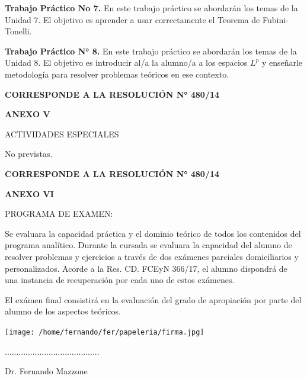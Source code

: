 \documentclass[a4paper, 12pt]{article}
\begin{document}
\noindent\textbf{Trabajo Práctico No 7.} En este trabajo práctico se abordarán los temas de la Unidad 7. El objetivo es aprender a usar correctamente el Teorema de Fubini-Tonelli.

\noindent\textbf{Trabajo Práctico N° 8.} En este trabajo práctico se abordarán los temas de la Unidad 8. El objetivo es introducir al/a la alumno/a a los espacios $L^{p}$ y enseñarle metodología para resolver problemas teóricos en ese contexto. 

\newpage






\begin{flushleft}
 \textbf{\large CORRESPONDE A LA RESOLUCIÓN N° 480/14}
\end{flushleft}


\begin{center}
 \textbf{\large ANEXO V}
\end{center}

ACTIVIDADES ESPECIALES 

No previstas.


\newpage






\begin{flushleft}
 \textbf{\large CORRESPONDE A LA RESOLUCIÓN N° 480/14}
\end{flushleft}


\begin{center}
 \textbf{\large ANEXO VI}
\end{center}

PROGRAMA DE EXAMEN:

Se evaluara la capacidad práctica y el dominio teórico de todos los contenidos del programa analítico. Durante  la cursada se evaluara la capacidad del alumno de resolver problemas y ejercicios  a través de dos exámenes parciales domiciliarios y personalizados.  Acorde a la Res. CD. FCEyN 366/17,  el alumno dispondrá de una instancia de recuperación por cada uno de estos exámenes.

El exámen final consistirá en la evaluación del grado de apropiación por parte del alumno de los aspectos teóricos. 

 \vspace{2cm}



\texttt{[image: /home/fernando/fer/papeleria/firma.jpg]}

\vspace{-2cm}

.........................................


{Dr. Fernando Mazzone}
  
\end{document}
